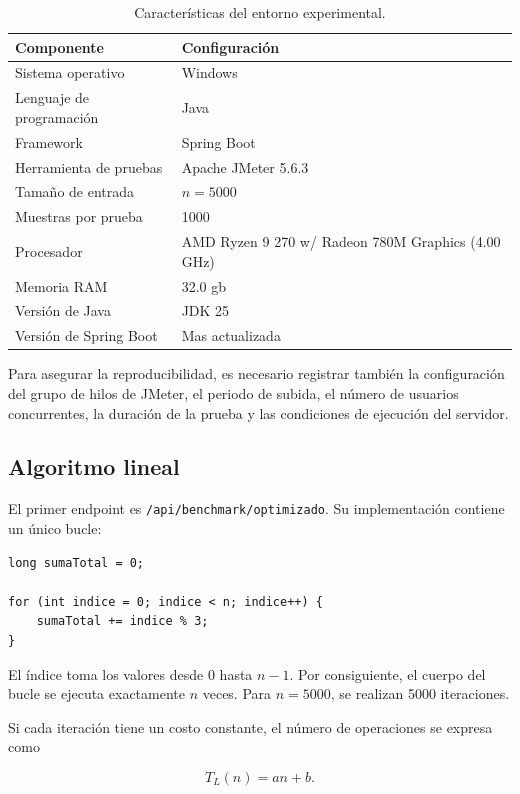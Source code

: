 \documentclass[runningheads]{llncs}
\begin{document}
\begin{table}[htbp]
\centering
\caption{Características del entorno experimental.}
\label{tab:entorno}
\begin{tabular}{ll}
\toprule
\textbf{Componente} & \textbf{Configuración} \\
\midrule
Sistema operativo & Windows \\
Lenguaje de programación & Java \\
Framework & Spring Boot \\
Herramienta de pruebas & Apache JMeter 5.6.3 \\
Tamaño de entrada & $n=5000$ \\
Muestras por prueba & 1000 \\
Procesador & AMD Ryzen 9 270 w/ Radeon 780M Graphics (4.00 GHz) \\
Memoria RAM & 32.0 gb \\
Versión de Java & JDK 25 \\
Versión de Spring Boot & Mas actualizada \\
\bottomrule
\end{tabular}
\end{table}

Para asegurar la reproducibilidad, es necesario
registrar también la configuración del grupo de
hilos de JMeter, el periodo de subida, el número
de usuarios concurrentes, la duración de la prueba
y las condiciones de ejecución del servidor.

\subsection{Algoritmo lineal}

El primer endpoint es \texttt{/api/benchmark/optimizado}.
Su implementación contiene un único bucle:

\begin{verbatim}
long sumaTotal = 0;

for (int indice = 0; indice < n; indice++) {
    sumaTotal += indice % 3;
}
\end{verbatim}

El índice toma los valores desde $0$ hasta $n-1$.
Por consiguiente, el cuerpo del bucle se ejecuta
exactamente $n$ veces. Para $n=5000$, se realizan
5000 iteraciones.

Si cada iteración tiene un costo constante,
el número de operaciones se expresa como

\begin{equation}
T_L(n)=an+b.
\end{equation}
\end{document}
